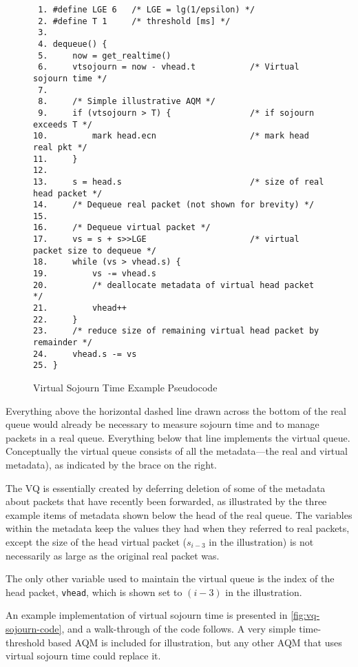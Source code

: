 \begin{figure*}
\small
\begin{verbatim}
 1. #define LGE 6   /* LGE = lg(1/epsilon) */
 2. #define T 1     /* threshold [ms] */
 3. 
 4. dequeue() {
 5.     now = get_realtime()
 6.     vtsojourn = now - vhead.t           /* Virtual sojourn time */
 7.
 8.     /* Simple illustrative AQM */
 9.     if (vtsojourn > T) {                /* if sojourn exceeds T */
10.         mark head.ecn                   /* mark head real pkt */
11.     }
12. 
13.     s = head.s                          /* size of real head packet */
14.     /* Dequeue real packet (not shown for brevity) */
15.
16.     /* Dequeue virtual packet */
17.     vs = s + s>>LGE                     /* virtual packet size to dequeue */ 
18.     while (vs > vhead.s) {
19.         vs -= vhead.s
20.         /* deallocate metadata of virtual head packet */
21.         vhead++
22.     }
23.     /* reduce size of remaining virtual head packet by remainder */
24.     vhead.s -= vs
25. }
\end{verbatim}
\caption{Virtual Sojourn Time Example Pseudocode}\label{fig:vq-sojourn-code}
\end{figure*}

Everything above the horizontal dashed line drawn across the bottom of the real queue would already be necessary to measure sojourn time and to manage packets in a real queue. Everything below that line implements the virtual queue. Conceptually the virtual queue consists of all the metadata---the real and virtual metadata), as indicated by the brace on the right.

The VQ is essentially created by deferring deletion of some of the metadata about packets that have recently been forwarded, as illustrated by the three example items of metadata shown below the head of the real queue. The variables within the metadata keep the values they had when they referred to real packets, except the size of the head virtual packet (\(s_{i-3}\) in the illustration) is not necessarily as large as the original real packet was.

The only other variable used to maintain the virtual queue is the index of the head packet, \texttt{vhead}, which is shown set to \((i-3)\) in the illustration.

An example implementation of virtual sojourn time is presented in \autoref{fig:vq-sojourn-code}, and a walk-through of the code follows. A very simple time-threshold based AQM is included for illustration, but any other AQM that uses virtual sojourn time could replace it.

